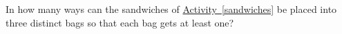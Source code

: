 \documentclass{book}
\begin{document}
\setcounter{project}{205}
\addtocounter{project}{-1}
\begin{activity}[]\label{activity-198}
\hypertarget{p-1145}{}%
In how many ways can the sandwiches of \hyperref[sandwiches]{Activity~\ref{sandwiches}} be placed into three distinct bags so that each bag gets at least one?%
\end{activity}
\end{document}
